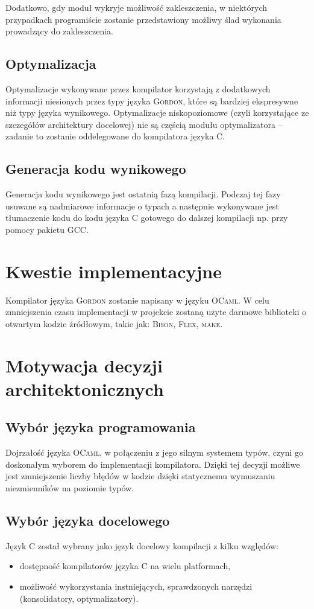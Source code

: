 \documentclass{documentation}
\begin{document}
Dodatkowo, gdy moduł wykryje możliwość zakleszczenia, w niektórych przypadkach programiście
zostanie przedstawiony możliwy ślad wykonania prowadzący do zakleszczenia. 

\subsection{Optymalizacja}
\noindent Optymalizacje wykonywane przez kompilator korzystają z dodatkowych informacji
niesionych przez typy języka \textsc{Gordon}, które są bardziej ekspresywne niż typy języka
wynikowego.
Optymalizacje niskopoziomowe (czyli korzystające ze szczegółów architektury docelowej) nie
są częścią modułu optymalizatora -- zadanie to zostanie oddelegowane do kompilatora języka \textsc{C}.

\subsection{Generacja kodu wynikowego}
\noindent Generacja kodu wynikowego jest ostatnią fazą kompilacji. Podczaj tej fazy usuwane są
nadmiarowe informacje o typach a następnie wykonywane jest tłumaczenie kodu do kodu języka
\textsc{C} gotowego do dalszej kompilacji np. przy pomocy pakietu \textsc{GCC}.

\section{Kwestie implementacyjne}
\noindent Kompilator języka \textsc{Gordon} zostanie napisany w języku \textsc{OCaml}. W celu
zmniejszenia czasu implementacji w projekcie zostaną użyte darmowe biblioteki o otwartym
kodzie źródłowym, takie jak: \textsc{Bison}, \textsc{Flex}, \textsc{make}.

\section{Motywacja decyzji architektonicznych}
\subsection{Wybór języka programowania}
\noindent Dojrzałość języka \textsc{OCaml}, w połączeniu z jego silnym systemem typów,
czyni go doskonałym wyborem do implementacji kompilatora. Dzięki tej
decyzji możliwe jest zmniejszenie liczby błędów w kodzie dzięki statycznemu
wymuszaniu niezmienników na poziomie typów.

\subsection{Wybór języka docelowego}
\noindent Język \textsc{C} został wybrany jako język docelowy kompilacji z kilku względów:
\begin{itemize}
    \item dostępność kompilatorów języka \textsc{C} na wielu platformach,
    \item możliwość wykorzystania instniejących, sprawdzonych narzędzi (konsolidatory,
        optymalizatory).
\end{itemize}
\end{document}
